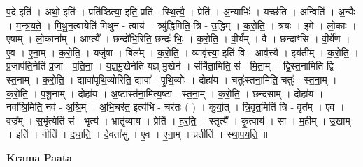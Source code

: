 \documentclass[17pt]{extarticle}
\begin{document}
प॒दे इति॑ । अथो॒ इति॑ । प्रति॑ष्ठित्या॒ इति॒ प्रति॑ - स्थि॒त्यै॒ । प्रेति॑ । अ॒न्याभिः॑ । यच्छ॑ति । अन्विति॑ । अ॒न्यैः । म॒न्त्र॒य॒ते॒ । मि॒थु॒न॒त्वायेति॑ मिथुन - त्वाय॑ । त्र्यु॑द्धि॒मिति॒ त्रि - उ॒द्धि॒म् । क॒रो॒ति॒ । त्रयः॑ । इ॒मे । लो॒काः । ए॒षाम् । लो॒काना᳚म् । आप्त्यै᳚ । छन्दो॑भि॒रिति॒ छन्दः॑-भिः॒ । क॒रो॒ति॒ । वी॒र्य᳚म् । वै । छन्दाꣳ॑सि । वी॒र्ये॑ण । ए॒व । ए॒ना॒म् । क॒रो॒ति॒ । यजु॑षा । बिल᳚म् । क॒रो॒ति॒ । व्यावृ॑त्त्या॒ इति॑ वि - आवृ॑त्त्यै । इय॑तीम् । क॒रो॒ति॒ । प्र॒जाप॑ति॒नेति॑ प्र॒जा - प॒ति॒ना॒ । य॒ज्ञ्॒मु॒खेनेति॑ यज्ञ्-मु॒खेन॑ । संमि॑ता॒मिति॒ सं - मि॒ता॒म् । द्वि॒स्त॒नामिति॑ द्वि - स्त॒नाम् । क॒रो॒ति॒ । द्यावा॑पृथि॒व्योरिति॒ द्यावा᳚ - पृ॒थि॒व्योः । दोहा॑य । चतुः॑स्तना॒मिति॒ चतुः॑ - स्त॒ना॒म् । क॒रो॒ति॒ । प॒शू॒नाम् । दोहा॑य । अ॒ष्टास्त॑ना॒मित्य॒ष्टा - स्त॒ना॒म् । क॒रो॒ति॒ । छन्द॑साम् । दोहा॑य । नवा᳚श्रि॒मिति॒ नव॑ - अ॒श्रि॒म् । अ॒भि॒चर॑त॒ इत्य॑भि - चर॑तः ( ) । कु॒र्या॒त् । त्रि॒वृत॒मिति॑ त्रि - वृत᳚म् । ए॒व । वज्र᳚म् । स॒भृंत्येति॑ सं - भृत्य॑ । भ्रातृ॑व्याय । प्रेति॑ । ह॒र॒ति॒ । स्तृत्यै᳚ । कृ॒त्वाय॑ । सा । म॒हीम् । उ॒खाम् । इति॑ । नीति॑ । द॒धा॒ति॒ । दे॒वता॑सु । ए॒व । ए॒ना॒म् । प्रतीति॑ । स्था॒प॒य॒ति॒ ॥  \newline


\textbf{Krama Paata} \newline
\end{document}
